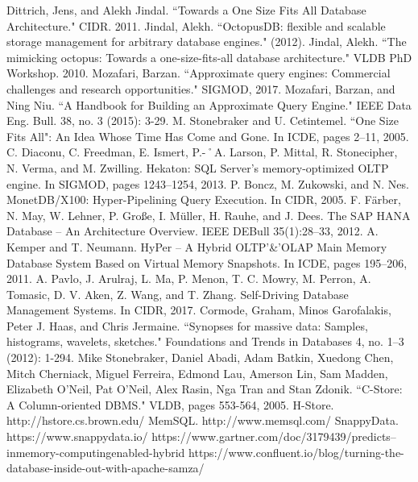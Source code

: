 \documentclass[10pt, conference, compsocconf]{IEEEtran}
\begin{document}
\begin{thebibliography}{1}
Dittrich, Jens, and Alekh Jindal. ``Towards a One Size Fits All Database Architecture." CIDR. 2011.
Jindal, Alekh. ``OctopusDB: flexible and scalable storage management for arbitrary database engines." (2012).
Jindal, Alekh. ``The mimicking octopus: Towards a one-size-fits-all database architecture." VLDB PhD Workshop. 2010.
Mozafari, Barzan. ``Approximate query engines: Commercial challenges and research opportunities." SIGMOD, 2017.
Mozafari, Barzan, and Ning Niu. ``A Handbook for Building an Approximate Query Engine." IEEE Data Eng.
Bull. 38, no. 3 (2015): 3-29.
M. Stonebraker and U. Cetintemel. ``One Size Fits All": An Idea Whose Time Has Come and Gone. In ICDE, pages 2–11, 2005.
C. Diaconu, C. Freedman, E. Ismert, P.-˚A. Larson, P. Mittal, R. Stonecipher, N. Verma, and M. Zwilling. Hekaton: SQL Server’s memory-optimized OLTP engine. In SIGMOD, pages 1243–1254, 2013.
P. Boncz, M. Zukowski, and N. Nes. MonetDB/X100: Hyper-Pipelining Query Execution. In CIDR, 2005.
F. Färber, N. May, W. Lehner, P. Große, I. Müller, H. Rauhe, and J. Dees. The SAP HANA Database – An Architecture Overview. IEEE DEBull 35(1):28–33, 2012.
A. Kemper and T. Neumann. HyPer – A Hybrid OLTP'\&'OLAP Main Memory Database System Based on Virtual Memory Snapshots. In ICDE, pages 195–206, 2011.
A. Pavlo, J. Arulraj, L. Ma, P. Menon, T. C. Mowry, M. Perron, A. Tomasic, D. V. Aken, Z. Wang, and T. Zhang. Self-Driving Database Management Systems. In CIDR, 2017.
Cormode, Graham, Minos Garofalakis, Peter J. Haas, and Chris Jermaine. ``Synopses for massive data: Samples, histograms, wavelets, sketches." Foundations and Trends in Databases 4, no. 1–3 (2012): 1-294.
Mike Stonebraker, Daniel Abadi, Adam Batkin, Xuedong Chen, Mitch Cherniack, Miguel Ferreira, Edmond Lau, Amerson Lin, Sam Madden, Elizabeth O'Neil, Pat O'Neil, Alex Rasin, Nga Tran and Stan Zdonik. ``C-Store: A Column-oriented DBMS." VLDB, pages 553-564, 2005. 
H-Store. http://hstore.cs.brown.edu/
MemSQL. http://www.memsql.com/
SnappyData. https://www.snappydata.io/
https://www.gartner.com/doc/3179439/predicts--inmemory-computingenabled-hybrid
https://www.confluent.io/blog/turning-the-database-inside-out-with-apache-samza/

\end{thebibliography}
\end{document}
